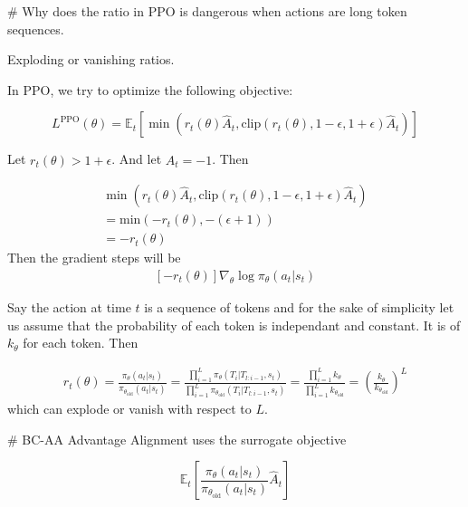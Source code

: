 

# Why does the ratio in PPO is dangerous when actions are long token sequences. 

Exploding or vanishing ratios. 

In PPO, we try to optimize the following objective: 

$$
L^{\text{PPO}}(\theta) = \mathbb{E}_t \left[ \min \left( r_t(\theta) \hat{A}_t, \text{clip}(r_t(\theta), 1 - \epsilon, 1 + \epsilon) \hat{A}_t \right) \right]
$$

Let $r_t(\theta) > 1 + \epsilon$. And let $\hat{A}_t = -1$. Then 

$$
\begin{aligned}
\min(r_t(\theta) \hat{A}_t, \text{clip}(r_t(\theta), 1 - \epsilon, 1 + \epsilon) \hat{A}_t)\\
 = \text{min}(-r_t(\theta), - (\epsilon +1)) \\
= -r_t(\theta)
\end{aligned}
$$
Then the gradient steps will be
$$
\begin{aligned}
\left[ -r_t(\theta) \right]\nabla_\theta \log \pi_\theta(a_t | s_t) 
\end{aligned}
$$


Say the action at time $t$ is a sequence of tokens and for the sake of simplicity let us assume that the probability of each token is independant and constant. It is of $k_\theta$ for each token.
Then

$$
\begin{aligned}
r_t(\theta) = \frac{\pi_\theta(a_t | s_t)}{\pi_{\theta_{\text{old}}}(a_t | s_t)} =
\frac{\prod_{i=1}^{L} \pi_\theta(T_{i} | T_{l:i-1}, s_t)}{\prod_{i=1}^{L} \pi_{\theta_{\text{old}}}(T_{i} | T_{l:i-1}, s_t)}
=
\frac{\prod_{i=1}^{L} k_\theta}{\prod_{i=1}^{L} k_{\theta_{\text{old}}}}
=
(\frac{k_\theta}{k_{\theta_{\text{old}}}})^{L}
\end{aligned}
$$
which can explode or vanish with respect to $L$. 

# BC-AA
Advantage Alignment uses the surrogate objective

$$
\mathbb{E}_t \left[ \frac{\pi_\theta(a_t | s_t)}{\pi_{\theta_{\text{old}}}(a_t | s_t)} \hat{A}_t \right]
$$

